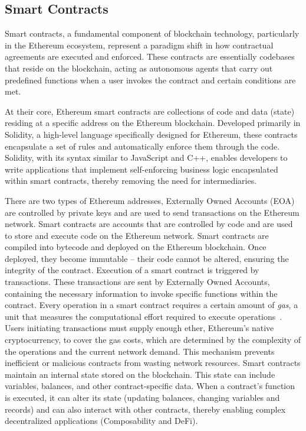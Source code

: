 \subsection{Smart Contracts}

Smart contracts, a fundamental component of blockchain technology, particularly in the Ethereum ecosystem, represent a paradigm shift in how contractual agreements are executed and enforced. These contracts are essentially codebases that reside on the blockchain, acting as autonomous agents that carry out predefined functions when a user invokes the contract and certain conditions are met. 

At their core, Ethereum smart contracts are collections of code and data (state) residing at a specific address on the Ethereum blockchain. Developed primarily in Solidity, a high-level language specifically designed for Ethereum, these contracts encapsulate a set of rules and automatically enforce them through the code. Solidity, with its syntax similar to JavaScript and C++, enables developers to write applications that implement self-enforcing business logic encapsulated within smart contracts, thereby removing the need for intermediaries.

There are two types of Ethereum addresses, Externally Owned Accounts (EOA) are controlled by private keys and are used to send transactions on the Ethereum network. Smart contracts are accounts that are controlled by code and are used to store and execute code on the Ethereum network. Smart contracts are compiled into bytecode and deployed on the Ethereum blockchain. Once deployed, they become immutable – their code cannot be altered, ensuring the integrity of the contract. Execution of a smart contract is triggered by transactions. These transactions are sent by Externally Owned Accounts, containing the necessary information to invoke specific functions within the contract. Every operation in a smart contract requires a certain amount of \textit{gas}, a unit that measures the computational effort required to execute operations~\cite{gasethereumorg}. Users initiating transactions must supply enough ether, Ethereum's native cryptocurrency, to cover the gas costs, which are determined by the complexity of the operations and the current network demand. This mechanism prevents inefficient or malicious contracts from wasting network resources. Smart contracts maintain an internal state stored on the blockchain. This state can include variables, balances, and other contract-specific data. When a contract's function is executed, it can alter its state (\eg updating balances, changing variables and records) and can also interact with other contracts, thereby enabling complex decentralized applications (Composability and DeFi).

